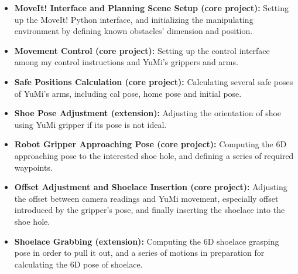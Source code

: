 \begin{itemize}
    \item \textbf{MoveIt! Interface and Planning Scene Setup (core project):} Setting up the MoveIt! Python interface, and initializing the manipulating environment by defining known obstacles' dimension and position.
    \item \textbf{Movement Control (core project):} Setting up the control interface among my control instructions and YuMi's grippers and arms.
    \item \textbf{Safe Positions Calculation (core project):} Calculating several safe poses of YuMi's arms, including cal pose, home pose and initial pose.
    \item \textbf{Shoe Pose Adjustment (extension):} Adjusting the orientation of shoe using YuMi gripper if its pose is not ideal. 
    \item \textbf{Robot Gripper Approaching Pose (core project):} Computing the 6D approaching pose to the interested shoe hole, and defining a series of required waypoints.
    \item \textbf{Offset Adjustment and Shoelace Insertion (core project):} Adjusting the offset between camera readings and YuMi movement, especially offset introduced by the gripper's pose, and finally inserting the shoelace into the shoe hole.
    \item \textbf{Shoelace Grabbing (extension):} Computing the 6D shoelace grasping pose in order to pull it out, and a series of motions in preparation for calculating the 6D pose of shoelace.
\end{itemize}



